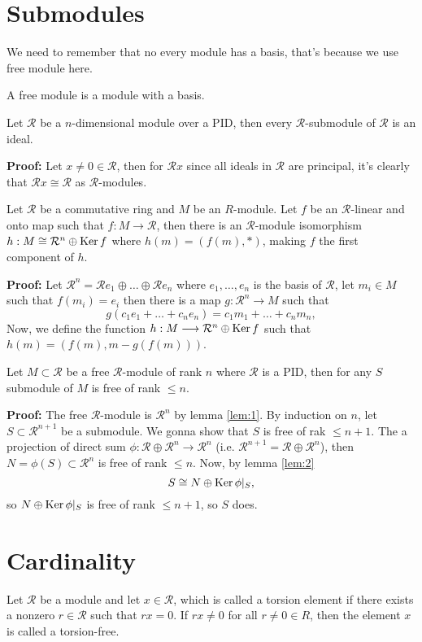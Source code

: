 \documentclass[11pt]{scrartcl}
\newcommand{\CR}{\mathcal R}
\begin{document}
\section{Submodules}
We need to remember that no every module has a basis, that's because
we use free module here.
\begin{definition*}
  A free module is a module with a basis.
\end{definition*}
\begin{lemma}
  \label{lem:1}
Let $\CR$ be a $n$-dimensional module over a PID, then every
$\CR$-submodule of $\CR$ is an ideal.
\end{lemma}
\textbf{Proof: }Let $x \neq 0 \in \CR$, then for $\CR x$ since all ideals in
$\CR$ are principal, it's clearly that $\CR x \cong \CR$ as $\CR$-modules.
\qedsymbol
\begin{lemma}
  \label{lem:2}
  Let $\CR$ be a commutative ring and $M$ be an $R$-module. Let $f$ be
  an $\CR$-linear and onto map such that $f: M \longrightarrow \CR$, then
  there is an $\CR$-module isomorphism $h: M \cong \CR^{n} \oplus \Ker f$
  where $h(m) = (f(m), *)$, making $f$ the first component of $h$.
\end{lemma}
\textbf{Proof: }Let $\CR^{n} = \CR e_{1} \oplus \dots \oplus \CR e_{n}$ where
$e_{1}, \dots, e_{n}$ is the basis of $\CR$, let $m_{i} \in M$ such that
$f(m_{i}) = e_{i}$ then there is a map $g: \CR^{n} \longrightarrow M$ such that
$$
g(c_{1}e_{1} + \dots + c_{n}e_{n}) = c_{1}m_{1} + \dots + c_{n}m_{n},
$$
Now, we define the function $h: M \longrightarrow \CR^{n} \oplus \Ker f$ such that
$h(m) = (f(m), m - g(f(m)))$. \qedsymbol
\begin{theorem}
  \label{theo:2}
  Let $M \subset \CR$ be a free $\CR$-module of rank $n$ where $\CR$ is a PID,
  then for any $S$ submodule of $M$ is free of rank $\leq n$.
\end{theorem}
\textbf{Proof: }The free $\CR$-module is $\CR^{n}$ by lemma \ref{lem:1}. By induction on $n$, let $S \subset \CR^{n+1}$ be a submodule.
We gonna show that $S$ is free of rak $\leq n+1$. The a projection of direct
sum $\phi: \CR \oplus \CR^{n} \longrightarrow \CR^{n}$ (i.e. $\CR^{n+1} = \CR \oplus \CR^{n}$), then $N = \phi(S) \subset \CR^{n}$ is free of rank $\leq n$.
Now, by lemma \ref{lem:2}
$$
S \cong N \oplus \operatorname{Ker} \phi \vert_{S},
$$
so $N \oplus \operatorname{Ker} \phi \vert_{S}$ is free of rank $\leq n+1$, so $S$ does. \qedsymbol

\section{Cardinality}
\begin{definition*}
  Let $\CR$ be a module and let $x \in \CR$, which is called a torsion
  element if there exists a nonzero $r \in \CR$ such that $rx = 0$. If $rx \neq 0$ for all $r \neq 0 \in R$, then the element $x$ is called a torsion-free.
\end{definition*}
\end{document}
